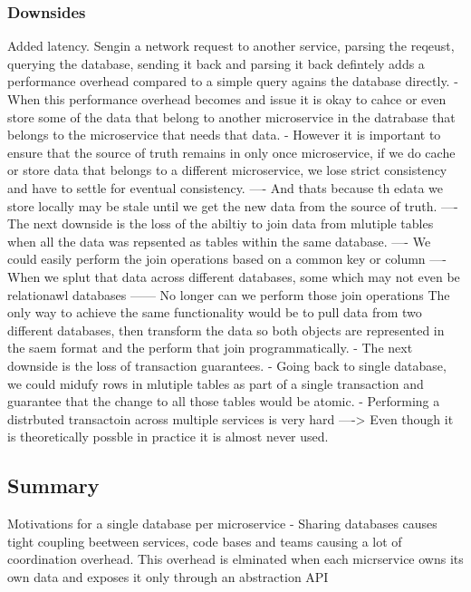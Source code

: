 \documentclass[a4paper, 11pt]{book}
\begin{document}
    \subsubsection{Downsides}
    Added latency. Sengin a network request to another service, parsing the reqeust, querying the database, sending it back and parsing it back defintely adds a performance overhead compared to a simple query agains the database directly.
    - When this performance overhead becomes and issue it is okay to cahce or even store some of the data that belong to another microservice in the datrabase that belongs to the microservice that needs that data.
    - However it is important to ensure that the source of truth remains in only once microservice, if we do cache or store data that belongs to a different microservice, we lose strict consistency and have to settle for eventual consistency.
    ---- And thats because th edata we store locally may be stale until we get the new data from the source of truth.
    ---- The next downside is the loss of the abiltiy to join data from mlutiple tables when all the data was repsented as tables within the same database.
    ---- We could easily perform the join operations based on a common key or column
    ---- When we splut that data across different databases, some which may not even be relationawl databases
    ------ No longer can we perform those join operations
    The only way to achieve the same functionality would be to pull data from two different databases, then transform the data so both objects are represented in the saem format and the perform that join programmatically.
    - The next downside is the loss of transaction guarantees.
    - Going back to single database, we could midufy rows in mlutiple tables as part of a single transaction and guarantee that the change to all those tables would be atomic.
    - Performing a distrbuted transactoin across multiple services is very hard
    ----> Even though it is theoretically possble in practice it is almost never used.

    \subsection{Summary}
    Motivations for a single database per microservice
    - Sharing databases causes tight coupling beetween services, code bases and teams causing a lot of coordination overhead.
    This overhead is elminated when each micrservice owns its own data and exposes it only through an abstraction API
\end{document}
